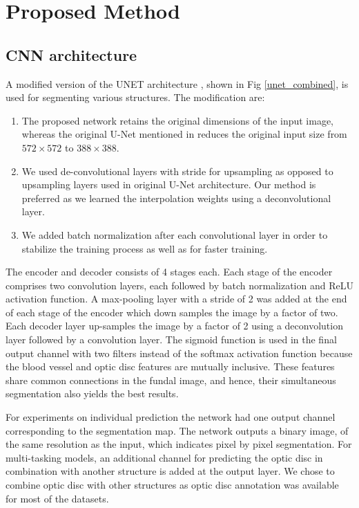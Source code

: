 \documentclass{article}
\begin{document}
\section{Proposed Method}
\subsection{CNN architecture}
A modified version of the UNET architecture \cite{ronneberger2015u}, shown in Fig \ref{unet_combined}, is used for segmenting various structures. The modification are:
\begin{enumerate}
\item The proposed network retains the original dimensions of the input image, whereas the original U-Net mentioned in \cite{ronneberger2015u} reduces the original  input size from $572 \times 572$ to $388 \times 388$.

\item We used de-convolutional layers with stride for upsampling as opposed to  upsampling layers used in original U-Net architecture. Our method is preferred as we learned the interpolation weights using a deconvolutional layer.
\item We added batch normalization after each convolutional layer in order to stabilize the training process as well as for faster training.
\end{enumerate}

The encoder and decoder consists of 4 stages each.
Each stage of the encoder comprises two convolution layers, each followed by batch normalization and ReLU activation function.
A max-pooling layer with a stride of 2 was added at the end of each stage of the encoder which down samples the image by a factor of two.
Each decoder layer up-samples the image by a factor of 2 using  a deconvolution layer followed by a convolution layer. The sigmoid function is used in the final output channel with two filters instead of the softmax activation function because the blood vessel and optic disc features are  mutually inclusive. These features share common connections in the fundal image, and hence, their simultaneous segmentation also yields the best results.

For experiments on individual prediction the network had one output channel corresponding to the segmentation map.
The network outputs a binary image, of the same resolution as the input,  which indicates pixel by pixel segmentation.
For multi-tasking models, an additional channel for predicting the optic disc in combination with another structure  is added at the output layer.
We chose to combine optic disc with other structures as optic disc annotation was available for most of the datasets.
\end{document}
